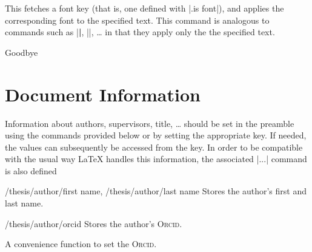 \begin{command}{\thesisfont{}}
  This fetches a font key (that is, one defined with |.is font|), and applies
  the corresponding font to the specified text.  This command is analogous to
  commands such as |\textbf|, |\textsc|, \dots{} in that
  they apply only the the specified text.

\begin{codeexample}[]
 Goodbye
\end{codeexample}
\end{command}


\section{Document Information}
\label{sec:document_information}

Information about authors, supervisors, title, \dots{} should be set in the
preamble using the commands provided below or by setting the appropriate key.
If needed, the values can subsequently be accessed from the key.  In order to be
compatible with the usual way \LaTeX{} handles this information, the associated
|\@...| command is also defined

\begin{keylist}{
    /thesis/author/first name,
    /thesis/author/last name}
  Stores the author's first and last name.

\end{keylist}

\begin{key}{/thesis/author/orcid}
  Stores the author's \textsc{Orcid}.

  \begin{command}{\orcid{}}
    A convenience function to set the \textsc{Orcid}.
  \end{command}
\end{key}

